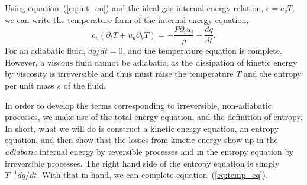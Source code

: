 \documentclass[letterpaper,12pt]{paper}
\begin{document}
Using equation~(\ref{eq:int_en}) and the ideal gas internal energy
relation, $\epsilon = c_v T$, we can write the temperature form of the
internal energy equation,
\begin{equation}
  \label{eq:temp_eq}
  c_v (\partial_t T + u_k \partial_k T)  = -\frac{P \partial_i
    u_i}{\rho} + \frac{dq}{dt}.
\end{equation}
For an adiabatic fluid, $dq/dt = 0$, and the temperature equation is
complete. However, a viscous fluid cannot be adiabatic, as the
dissipation of kinetic energy by viscosity is irreversible and thus
must raise the temperature $T$ and the entropy per unit mass $s$ of
the fluid.

In order to develop the terms corresponding to irreversible,
non-adiabatic processes, we make use of the total energy equation, and
the definition of entropy. In short, what we will do is construct a
kinetic energy equation, an entropy equation, and then show that the
losses from kinetic energy show up in the \emph{adiabatic} internal
energy by reversible processes and in the entropy equation by
irreversible processes. The right hand side of the entropy equation is
simply $T^{-1} dq/dt$. With that in hand, we can complete
equation~(\ref{eq:temp_eq}).
\end{document}
